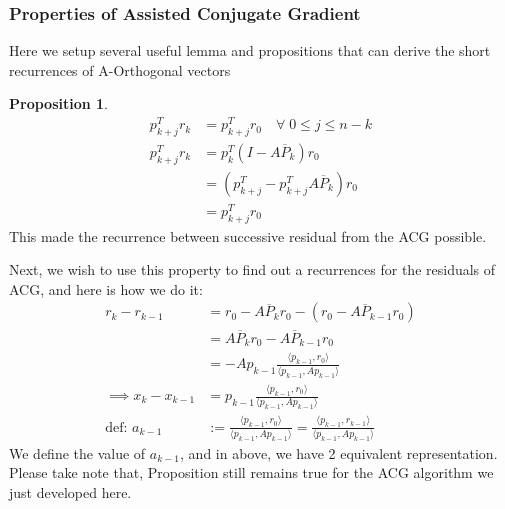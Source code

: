 \documentclass[]{article}
\theoremstyle{definition}
\newtheorem{prop}{Proposition}
\begin{document}
        \subsubsection{Properties of Assisted Conjugate Gradient}
            Here we setup several useful lemma and propositions that can derive the short recurrences of A-Orthogonal vectors 
            \begin{prop}
                \begin{align}
                    p_{k + j}^Tr_k &= p_{k + j}^Tr_0 \quad \forall \; 0 \le j \le n - k
                    \\
                    p_{k + j}^Tr_k &= p_k^T(I - A\overline{P}_k)r_0
                    \\
                    &= (p^T_{k + j} - p^T_{k + j}A\overline{P}_k)r_0
                    \\
                    &= p_{k + j}^Tr_0    
                \end{align}
                This made the recurrence between successive residual from the ACG possible. 
            \end{prop}
            Next, we wish to use this property to find out a recurrences for the residuals of ACG, and here is how we do it: 
            \begin{align}
                    r_k - r_{k - 1} &= r_0 - A\overline{P}_kr_0 - (r_0 - A\overline{P}_{k - 1}r_0)
                    \\
                    &= A\overline{P}_kr_0 - A\overline{P}_{k - 1}r_0
                    \\
                    &= - Ap_{k - 1}\frac{\langle p_{k - 1}, r_0\rangle}{\langle p_{k - 1}, Ap_{k - 1}\rangle}
                    \\
                    \implies 
                    x_{k} - x_{k - 1} &= 
                    p_{k - 1}\frac{\langle p_{k - 1}, r_0\rangle}{\langle p_{k - 1}, Ap_{k - 1}\rangle}
                    \\
                    \text{def: } a_{k - 1} &:= \frac{\langle p_{k - 1}, r_0\rangle}{
                        \langle p_{k - 1}, Ap_{k - 1}\rangle
                    } = 
                    \frac{\langle p_{k - 1}, r_{k - 1}\rangle}{
                        \langle p_{k - 1}, Ap_{k - 1}\rangle
                    }
            \end{align}
            We define the value of $a_{k - 1}$, and in above, we have 2 equivalent representation. Please take note that, Proposition still remains true for the ACG algorithm we just developed here. 
\end{document}
